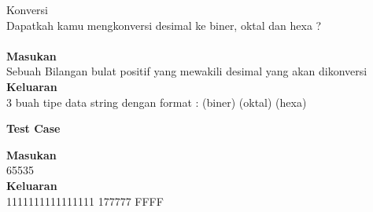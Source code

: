 \newpage
\begin{permasalahan}{Konversi}\\
\label{prob:Konversi}
	 Dapatkah kamu mengkonversi desimal ke biner, oktal dan hexa ?\\\\
	\textbf{Masukan}\\
	Sebuah Bilangan bulat positif yang mewakili desimal yang akan dikonversi
	\textbf{Keluaran}\\
	3 buah tipe data string dengan format : (biner) (oktal) (hexa) 	
	\begin{center}
	\textbf{Test Case}\\
	\end{center}
	\textbf{Masukan}\\
  65535\\
	\textbf{Keluaran}\\
		1111111111111111 177777 FFFF 
\end{permasalahan}


